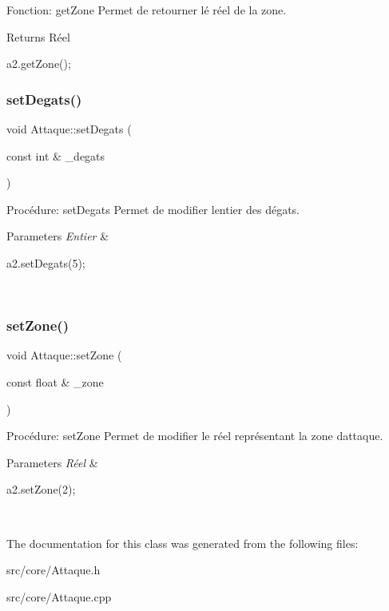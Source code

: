 Fonction\+: get\+Zone Permet de retourner lé réel de la zone. 

\begin{DoxyReturn}{Returns}
Réel 
\begin{DoxyCode}
a2.getZone();
\end{DoxyCode}
 
\end{DoxyReturn}
\mbox{\label{classAttaque_ad1af4e5ae848c40c7879fa4f9a56c674}} 
\subsubsection{\texorpdfstring{set\+Degats()}{setDegats()}}
{\footnotesize\ttfamily void Attaque\+::set\+Degats (\begin{DoxyParamCaption}\item[{const int \&}]{\+\_\+degats }\end{DoxyParamCaption})}



Procédure\+: set\+Degats Permet de modifier l\textquotesingle{}entier des dégats. 


\begin{DoxyParams}{Parameters}
{\em Entier} & 
\begin{DoxyCode}
a2.setDegats(5);
\end{DoxyCode}
 \\
\hline
\end{DoxyParams}
\mbox{\label{classAttaque_ae6dc5afd850f4518e937b8a2c08ac764}} 
\subsubsection{\texorpdfstring{set\+Zone()}{setZone()}}
{\footnotesize\ttfamily void Attaque\+::set\+Zone (\begin{DoxyParamCaption}\item[{const float \&}]{\+\_\+zone }\end{DoxyParamCaption})}



Procédure\+: set\+Zone Permet de modifier le réel représentant la zone d\textquotesingle{}attaque. 


\begin{DoxyParams}{Parameters}
{\em Réel} & 
\begin{DoxyCode}
a2.setZone(2);
\end{DoxyCode}
 \\
\hline
\end{DoxyParams}


The documentation for this class was generated from the following files\+:\begin{DoxyCompactItemize}
\item 
src/core/Attaque.\+h\item 
src/core/Attaque.\+cpp\end{DoxyCompactItemize}
